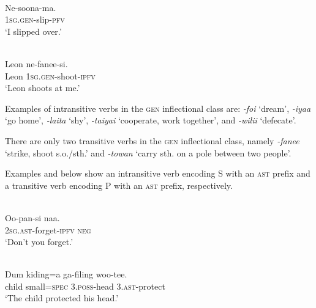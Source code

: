 \ea%
\label{bkm:Ref353451839}
 \\ 
\gll     Ne-soona-ma.  \\  
    1\textsc{sg.gen}{}-slip-\textsc{pfv}   \\
\glt  `I slipped over.'
\z








\ea%
\label{bkm:Ref324339697}
 \\ 
\gll     Leon  ne-fanee-si.\\  
  Leon  1\textsc{sg}.\textsc{gen}{}-shoot-\textsc{ipfv}   \\
\glt  `Leon shoots at me.'
\z



 



Examples of intransitive verbs in the \textsc{gen} inflectional class are: \textit{-foi} `dream', \textit{-iyaa} `go home', \textit{-laita} `shy', \textit{-taiyai} `cooperate, work together', and \textit{-wilii} `defecate'.

  There are only two transitive verbs in the \textsc{gen} inflectional class, namely \textit{-fanee} `strike, shoot s.o./sth.' and \textit{-towan} `carry sth. on a pole between two people'.

Examples  and  below show an intransitive verb encoding S with an \textsc{ast} prefix and a transitive verb encoding P with an \textsc{ast} prefix, respectively.


\ea%
\label{bkm:Ref324340307}
 \\ 
\gll     Oo-pan-si  naa.\\  
    2\textsc{sg.ast}{}-forget-\textsc{ipfv} \textsc{neg}  \\
\glt  `Don't you forget.'
\z








\ea%
\label{bkm:Ref324340314}
 \\ 
\gll   Dum  kiding=a  ga-filing  woo-tee. \\  
  child  small=\textsc{spec} \textsc{3.poss}{}-head  3.\textsc{ast}{}-protect   \\
\glt  `The child protected his head.'
\z



